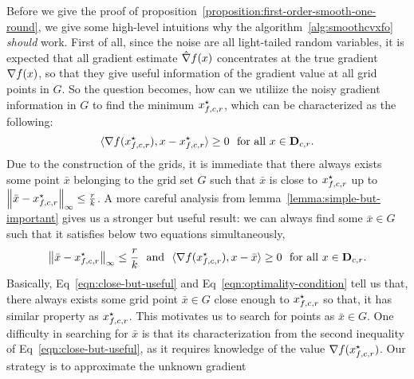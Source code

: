\begin{remark}
Before we give the proof of proposition~\ref{proposition:first-order-smooth-one-round}, 
we give some high-level intuitions why the algorithm~\ref{alg:smoothcvxfo} \emph{should}
work. First of all, since the noise are all light-tailed random variables, it is expected 
that all gradient estimate $\hat{\nabla} f(x)$ concentrates at the true gradient $\nabla f(x)$,
so that they give useful information of the gradient value at all grid points in $G$. So 
the question becomes, how can we utiliize the noisy gradient information in $G$ to 
find the minimum $x_{f, c, r}^\star$, which can be characterized as the following: 
\begin{equation}
\label{eqn:optimality-condition}
\langle \nabla f(x_{f, c, r}^\star), x - x_{f, c, r}^\star \rangle \geq 0~~\text{for all $x\in \mathbf{D}_{c, r}$}.
\end{equation}
Due to the construction of the grids, it is immediate that there always exists some 
point $\bar{x}$ belonging to the grid set $G$ such that $\bar{x}$ is close to 
$x_{f, c, r}^\star$ up to $\left\|{\bar{x} - x_{f, c, r}^\star}\right\|_\infty \leq \frac{r}{k}$. 
A more careful analysis from lemma~\ref{lemma:simple-but-important} gives 
us a stronger but useful result: we can always find some $\bar{x} \in G$ such that
it satisfies below two equations simultaneously, 
\begin{equation}
\label{eqn:close-but-useful}
\left\|{\bar{x} - x_{f, c, r}^\star}\right\|_\infty \leq \frac{r}{k}~~\text{and}~~
	\langle \nabla f(x_{f, c, r}^\star), x - \bar{x}\rangle \geq 0~~\text{for all $x\in \mathbf{D}_{c,r}$}.
\end{equation}
Basically, Eq~\eqref{eqn:close-but-useful} and Eq~\eqref{eqn:optimality-condition} tell
us that, there always exists some grid point $\bar{x}\in G$ close enough to $x_{f, c, r}^\star$
so that, it has similar property as $x_{f, c, r}^\star$. This motivates us to search for points
as $\bar{x} \in G$. One difficulty in searching for $\bar{x}$ is that its characterization 
from the second inequality of Eq~\eqref{eqn:close-but-useful}, as it requires knowledge 
of the value $\nabla f(x_{f, c, r}^\star)$. Our strategy is to approximate the unknown gradient 

\end{remark}
